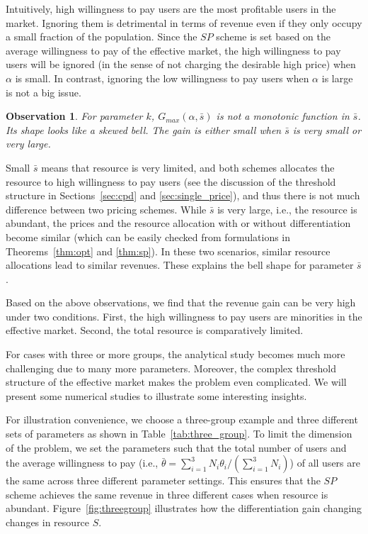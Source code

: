 \documentclass[twocolumn,10pt,twosided]{IEEEtran}
\newtheorem{observation}{Observation}
\begin{document}
Intuitively, high willingness to pay users are the most profitable users in the market. Ignoring them  is detrimental in terms of revenue even if they only occupy a small fraction of the population. Since the $SP$ scheme is set based on the average willingness to pay of the effective market, the high willingness to pay users will be ignored  (in the sense of not charging the desirable high price) when $\alpha$ is small. In contrast, ignoring the low willingness to pay users when $\alpha$ is large is not a big issue.


\begin{observation}
For parameter $k$, $G_{max}(\alpha,\bar{s})$ is not a monotonic function in $\bar{s}$. Its shape looks like a skewed bell. The gain is either small when $\bar{s}$ is very small or very large.
\end{observation}

Small $\bar{s}$ means that resource is very limited, and both schemes allocates the resource to high willingness to pay users (see the discussion of the threshold structure in Sections~\ref{sec:cpd} and \ref{sec:single_price}), and thus there is not much difference between two pricing schemes.
While $\bar{s}$ is very large, i.e., the resource is abundant, the prices and the resource allocation with or without differentiation become similar (which can be easily checked from formulations in Theorems~\ref{thm:opt} and \ref{thm:sp}).
In these two scenarios, similar resource allocations lead to similar revenues. These explains the bell shape for parameter $\bar{s}$.


Based on the above observations, we find that the revenue gain can be very high under two conditions. First, the high willingness to pay users are minorities in the effective market. Second, the total resource is comparatively limited.

For cases with three or more groups, the analytical study becomes much more challenging  due to many more parameters.  Moreover, the complex threshold structure of the effective market makes the problem even complicated. We will present some numerical studies to illustrate some interesting insights.

For illustration  convenience, we choose a three-group example and three different sets of parameters as shown in Table~\ref{tab:three_group}. To limit the dimension of the problem, we set the parameters such that the total number of users and the average willingness to pay (i.e., $\bar{\theta} = \sum_{i=1}^3 N_i\theta_i/(\sum_{i=1}^3  N_i)$) of all users are the same across three different parameter settings. This ensures that the $SP$ scheme achieves the same revenue in three different cases when resource is abundant. Figure~\ref{fig:threegroup} illustrates how the  differentiation gain changing changes in  resource $S$.
\end{document}
